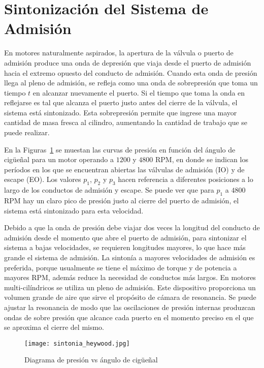 \section{Sintonización del Sistema de Admisión}\label{cap2_sec_sintonia_admision}
%
En motores naturalmente aspirados, la apertura de la válvula o puerto de
admisión produce una onda de depresión que viaja desde el puerto de admisión
hacia el extremo opuesto del conducto de admisión.
%
Cuando esta onda de presión llega al pleno de admisión, se refleja como una
onda de sobrepresión que toma un tiempo $t$ en alcanzar nuevamente el puerto.
%
Si el tiempo que toma la onda en reflejarse es tal que alcanza el puerto justo
antes del cierre de la válvula, el sistema está sintonizado.
%
Esta sobrepresión permite que ingrese una mayor cantidad de masa fresca al
cilindro, aumentando la cantidad de trabajo que se puede realizar.

En la Figuras~\ref{fig:sintonia_heywood} se muestan las curvas de presión en
función del ángulo de cigüeñal para un motor operando a $1200$ y $4800$ RPM, en
donde se indican los períodos en los que se encuentran abiertas las válvulas de
admisión (IO) y de escape (EO).
%
Los valores $p_{1}$, $p_{2}$ y $p_{3}$ hacen referencia a diferentes posiciones
a lo largo de los conductos de admisión y escape.
%
Se puede ver que para $p_{1}$ a $4800$ RPM hay un claro pico de presión justo al
cierre del puerto de admisión, el sistema está sintonizado para esta velocidad.

Debido a que la onda de presión debe viajar dos veces la longitud del conducto
de admisión desde el momento que abre el puerto de admisión, para sintonizar el
sistema a bajas velocidades, se requieren longitudes mayores, lo que hace más
grande el sistema de admisión.
%
La sintonía a mayores velocidades de admisión es preferida, porque usualmente se
tiene el máximo de torque y de potencia a mayores RPM, además reduce la
necesidad de conductos más largos.
%
En motores multi-cilíndricos se utiliza un pleno de admisión.
%
Este dispositivo proporciona un volumen grande de aire que sirve el propósito de
cámara de resonancia.
%
Se puede ajustar la resonancia de modo que las oscilaciones de presión internas
produzcan ondas de sobre presión que alcance cada puerto en el momento preciso
en el que se aproxima el cierre del mismo.

\begin{figure} \centering
\texttt{[image: sintonia\_heywood.jpg]}
    \caption{Diagrama de presión vs ángulo de cigüeñal~\parencite{heywood}}\label{fig:sintonia_heywood}
\end{figure}

